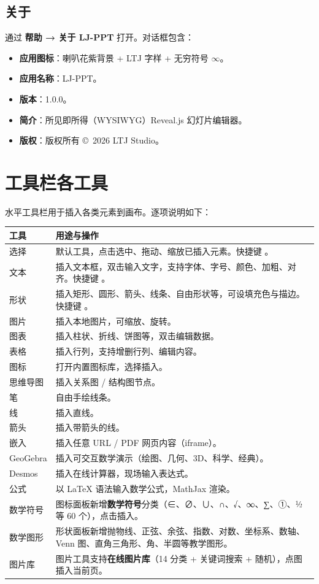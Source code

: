 \documentclass[12pt,a4paper]{ctexart}
\newcommand{\key}[1]{\fcolorbox{grayline}{white}{\small\ttfamily #1}}
\begin{document}
\subsection{关于}
\label{sec:about}
通过 \textbf{帮助 → 关于 LJ-PPT} 打开。对话框包含：
\begin{itemize}
  \item \textbf{应用图标}：喇叭花紫背景 + LTJ 字样 + 无穷符号 $\infty$。
  \item \textbf{应用名称}：LJ-PPT。
  \item \textbf{版本}：1.0.0。
  \item \textbf{简介}：所见即所得（WYSIWYG）Reveal.js 幻灯片编辑器。
  \item \textbf{版权}：版权所有 \copyright\ 2026 LTJ Studio。
\end{itemize}

\section{工具栏各工具}
水平工具栏用于插入各类元素到画布。逐项说明如下：

\begin{center}\renewcommand{\arraystretch}{1.35}
\begin{longtable}{@{}p{3.2cm}p{11.7cm}@{}}
\toprule
\textbf{工具} & \textbf{用途与操作} \\
\midrule
\endfirsthead
选择 & 默认工具，点击选中、拖动、缩放已插入元素。快捷键 \key{V}。 \\
文本 & 插入文本框，双击输入文字，支持字体、字号、颜色、加粗、对齐。快捷键 \key{T}。 \\
形状 & 插入矩形、圆形、箭头、线条、自由形状等，可设填充色与描边。快捷键 \key{S}。 \\
图片 & 插入本地图片，可缩放、旋转。 \\
图表 & 插入柱状、折线、饼图等，双击编辑数据。 \\
表格 & 插入行列，支持增删行列、编辑内容。 \\
图标 & 打开内置图标库，选择插入。 \\
思维导图 & 插入关系图 / 结构图节点。 \\
笔 & 自由手绘线条。 \\
线 & 插入直线。 \\
箭头 & 插入带箭头的线。 \\
嵌入 & 插入任意 URL / PDF 网页内容（iframe）。 \\
GeoGebra & 插入可交互数学演示（绘图、几何、3D、科学、经典）。 \\
Desmos & 插入在线计算器，现场输入表达式。 \\
公式 & 以 LaTeX 语法输入数学公式，MathJax 渲染。 \\
数学符号 & 图标面板新增\textbf{数学符号}分类（∈、∅、∪、∩、√、∞、∑、①、½ 等 60 个），点击插入。 \\
数学图形 & 形状面板新增抛物线、正弦、余弦、指数、对数、坐标系、数轴、Venn 图、直角三角形、角、半圆等教学图形。 \\
图片库 & 图片工具支持\textbf{在线图片库}（14 分类 + 关键词搜索 + 随机），点图插入当前页。 \\
\bottomrule
\end{longtable}
\end{center}
\end{document}
